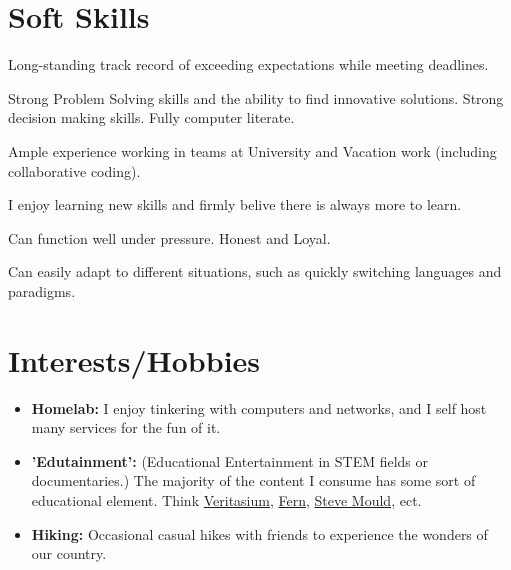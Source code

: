 \documentclass[11pt,a4paper]{article}
\begin{document}
\section{Soft Skills}
\begin{description}[noitemsep, leftmargin=4cm, style=multiline]
  \item [Dependability] Long-standing track record of exceeding expectations while meeting deadlines.
  \item [Logical Thinker] Strong Problem Solving skills and the ability to find innovative solutions. Strong decision making skills. Fully computer literate.
  \item [Collaboration] Ample experience working in teams at University and Vacation work (including collaborative coding).
  \item [Life Long Learner] I enjoy learning new skills and firmly belive there is always more to learn.
  \item [Reliability] Can function well under pressure. Honest and Loyal.
  \item [Flexable] Can easily adapt to different situations, such as quickly switching languages and paradigms.
\end{description}


\section{Interests/Hobbies}
\begin{itemize}[leftmargin=0.15in, noitemsep]
  \item \textbf{Homelab:} I enjoy tinkering with computers and networks, and I self host many services for the fun of it.
  \item \textbf{'Edutainment':} (Educational Entertainment in STEM fields or documentaries.) The majority of the content
    I consume has some sort of educational element. Think \href{https://www.veritasium.com/}{Veritasium},
    \href{https://www.youtube.com/@fern-tv}{Fern}, \href{https://stevemould.com/}{Steve Mould}, ect.
  \item \textbf{Hiking:} Occasional casual hikes with friends to experience the wonders of our country.
\end{itemize}
\end{document}
